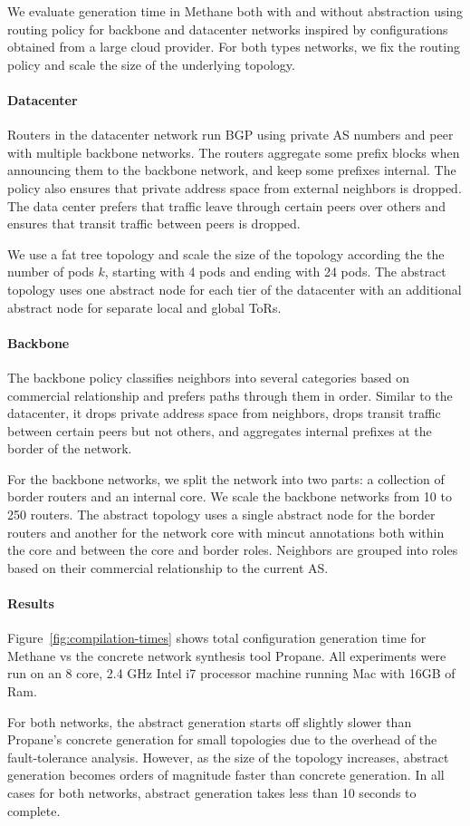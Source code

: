 \documentclass[numbers, 10pt, preprint]{sigplanconf}
\newcommand{\sysname}{{\small \sf Methane}\xspace}
\newcommand{\propane}{{\small \sf Propane}\xspace}
\newcommand{\para}[1]{\paragraph*{\textbf{#1}}}
\begin{document}
We evaluate generation time in \sysname both with and without abstraction using routing policy for backbone and datacenter networks inspired by configurations obtained from a large cloud provider. For both types networks, we fix the routing policy and scale the size of the underlying topology.


\para{Datacenter}

Routers in the datacenter network run BGP using private AS numbers and peer with multiple backbone networks. The routers aggregate some prefix blocks when announcing them to the backbone network, and keep some prefixes internal. The policy also ensures that private address space from external neighbors is dropped. The data center prefers that traffic leave through certain peers over others and ensures that transit traffic between peers is dropped.

We use a fat tree topology and scale the size of the topology according the the number of pods $k$, starting with 4 pods and ending with 24 pods. The abstract topology uses one abstract node for each tier of the datacenter with an additional abstract node for separate local and global ToRs.



\para{Backbone}

The backbone policy classifies neighbors into several categories based on commercial relationship and prefers paths through them in order. Similar to the datacenter, it drops private address space from  neighbors, drops transit traffic between certain peers but not others, and aggregates internal prefixes at the border of the network.

For the backbone networks, we split the network into two parts: a collection of border routers and an internal core. We scale the backbone networks from 10 to 250 routers. The abstract topology uses a single abstract node for the border routers and another for the network core with mincut annotations both within the core and between the core and border roles. Neighbors are grouped into roles based on their commercial relationship to the current AS.


\para{Results}

Figure~\ref{fig:compilation-times} shows total configuration generation time for \sysname vs the concrete network synthesis tool \propane. All experiments were run on an 8 core, 2.4 GHz Intel i7 processor machine running Mac with 16GB of Ram.

For both networks, the abstract generation starts off slightly slower than \propane's concrete generation for small topologies due to the overhead of the fault-tolerance analysis. However, as the size of the topology increases, abstract generation becomes orders of magnitude faster than concrete generation. In all cases for both networks, abstract generation takes less than 10 seconds to complete.
\end{document}
